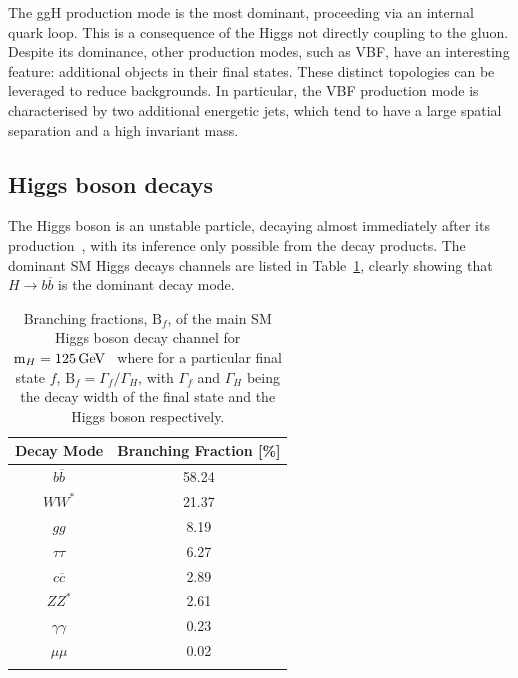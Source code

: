 The ggH production mode is the most dominant, proceeding via an internal quark loop. This is a consequence of the Higgs not directly coupling to the gluon. Despite its dominance, other production modes, such as VBF, have an interesting feature: additional objects in their final states. These distinct topologies can be leveraged to reduce backgrounds. In particular, the VBF production mode is characterised by two additional energetic jets, which tend to have a large spatial separation and a high invariant mass.

\subsection{Higgs boson decays}

The Higgs boson is an unstable particle, decaying almost immediately after its production~\cite{MarkThompson}, with its inference only possible from the decay products. The dominant \ac{SM} Higgs decays channels are listed in Table~\ref{Table:Introduction_HiggsBranchingFractions}, clearly showing that $H\rightarrow b\overline{b}$ is the dominant decay mode. 

\begin{table}[!htbp]
\centering
\renewcommand{\arraystretch}{1.5} %
\setlength{\tabcolsep}{12pt} %
\begin{tabular}{|c|c|}
\hline
Decay Mode                  & Branching Fraction {[}\%{]} \\ \hline \hline
$b\overline{b}$             & 58.24 \\ 
\arrayrulecolor{lightgray} \hline
$WW^*$                      & 21.37 \\ 
\arrayrulecolor{lightgray} \hline
$gg$                        & 8.19  \\ 
\arrayrulecolor{lightgray} \hline
$\tau\tau$                  & 6.27  \\ 
\arrayrulecolor{lightgray} \hline
$c\overline{c}$             & 2.89  \\ 
\arrayrulecolor{lightgray} \hline
$ZZ^*$                      & 2.61  \\ 
\arrayrulecolor{lightgray} \hline
$\gamma\gamma$              & 0.23  \\ 
\arrayrulecolor{lightgray} \hline
$\mu\mu$                    & 0.02  \\ 
\arrayrulecolor{black} \hline
\end{tabular}
\caption[Branching fractions of main Standard Model Higgs decay channels at $\text{m}_H = 125\GeV$]{Branching fractions, $\text{B}_f$, of the main \ac{SM} Higgs boson decay channel for $\text{m}_H = 125\GeV$~\cite{HiggsProduction_XS_13TeV,HiggsProduction_XS_13p6TeV} where for a particular final state $f$, $\text{B}_f = \Gamma_f/\Gamma_H$, with $\Gamma_f$ and $\Gamma_H$ being the decay width of the final state and the Higgs boson respectively.}
\label{Table:Introduction_HiggsBranchingFractions}
\end{table}

